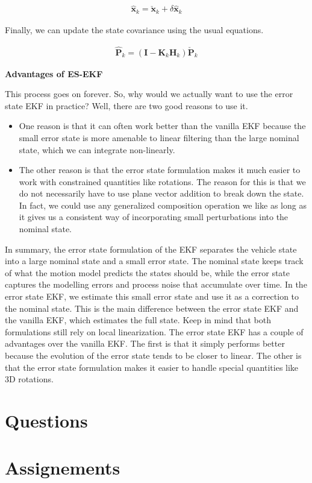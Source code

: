 \begin{eqnarray}
\hat{\mathbf{x}}_{k} = \check{\mathbf{x}}_{k} + \delta \hat{\mathbf{x}}_{k}
\end{eqnarray}

Finally, we can update the state covariance using the usual equations.

\begin{eqnarray}
\hat{\mathbf{P}}_{k} = (\mathbf{I} - \mathbf{K}_{k} \mathbf{H}_{k})\check{\mathbf{P}}_{k}
\end{eqnarray}

\textbf{Advantages of ES-EKF}

This process goes on forever. So, why would we actually want to use the error state EKF
in practice? Well, there are two good reasons to use it. 

\begin{itemize}
\item One reason is that it can often work better than the vanilla EKF because the small error
state is more amenable to linear filtering than the large nominal state, which we can integrate non-linearly. 
\item The other reason is that the error state formulation makes it much easier to work with constrained quantities like rotations. 
The reason for this is that we do not necessarily have to use plane vector addition to break down the state. In fact, we could use any generalized
composition operation we like as long as it gives us a consistent way of incorporating small perturbations into the nominal state. 
\end{itemize}

In summary, the error state formulation of the EKF separates the vehicle state into a large nominal state and a small error state. The nominal state
keeps track of what the motion model predicts the states should be, while the error state captures the
modelling errors and process noise that accumulate over time. In the error state EKF, we estimate
this small error state and use it as a correction to the nominal state. This is the main
difference between the error state EKF and the vanilla EKF, which estimates the full state. Keep in mind that both formulations still rely on
local linearization. The error state EKF has a couple of advantages over the vanilla EKF. The first is that it simply performs better because
the evolution of the error state tends to be closer to linear. The other is that the error state formulation makes it easier to handle special quantities like 3D rotations. 
\section{Questions}
\section{Assignements}
